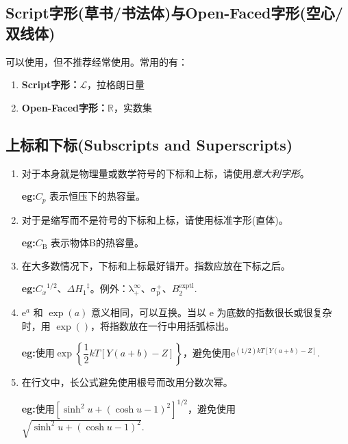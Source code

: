 \subsection{Script字形(草书/书法体)与Open-Faced字形(空心/双线体)}
可以使用，但不推荐经常使用。常用的有：

\begin{enumerate}[label=(\arabic*)]
    \item \textbf{Script字形：}$\mathscr{L}$，拉格朗日量
    \item \textbf{Open-Faced字形：}$\mathbb{R}$，实数集
\end{enumerate}

\subsection{上标和下标(Subscripts and Superscripts)}

\begin{enumerate}[label=(\arabic*),itemsep=5pt]
    \item 对于本身就是物理量或数学符号的下标和上标，请使用\textit{意大利字形}。

            {\textbf{eg:\qquad }$C_p$ 表示恒压下的热容量。}

    \item 对于是缩写而不是符号的下标和上标，请使用标准字形(直体)。

            {\textbf{eg:\qquad }$C_\mathrm{B}$ 表示物体B的热容量。}
 
    \item 在大多数情况下，下标和上标最好错开。指数应放在下标之后。

            {\textbf{eg:\qquad }${C_x}^{1/2}$、$\Delta {H_1}^{\ddagger}$。\qquad 例外：$\mathrm{\lambda}_{+}^\infty$、$\mathrm{\sigma}_\mathrm{p}^+$、$B_2^{\mathrm{exptl}}$.}

    \item $\mathrm{e}^a$ 和 $\exp(a)$ 意义相同，可以互换。当以 $\mathrm{e}$ 为底数的指数很长或很复杂时，用 $\exp()$，将指数放在一行中用括弧标出。

            {\textbf{eg:\qquad }使用$\exp \left\{ \dfrac{1}{2}kT\left[ Y\left( a+b \right) -Z \right] \right\}$，避免使用$\mathrm{e}^{(1/2)kT\left[ Y\left( a+b \right) -Z \right]}.$}

    \item 在行文中，长公式避免使用根号而改用分数次幂。

            {\textbf{eg:\qquad }使用$\left[ \sinh ^2u+\left( \cosh u-1 \right) ^2 \right] ^{1/2}$，避免使用$\sqrt{ \sinh ^2u+\left( \cosh u-1 \right) ^2 }.$}
\end{enumerate}